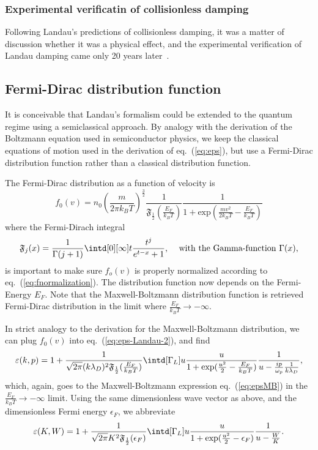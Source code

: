 \documentclass[physics,phd,nolot,nolof]{uccthesis}%
\begin{document}
\subsubsection{Experimental verificatin of collisionless damping}
Following Landau's predictions of collisionless damping, it was a matter of discussion whether it was a physical effect\cite{boydsanderson},
and the experimental verification of Landau damping came only 20 years later~\cite{PhysRevLett.13.184,PhysRevLett.17.175}.
\subsection{Fermi-Dirac distribution function}
It is conceivable that Landau's formalism could be extended to the quantum regime using a semiclassical approach. 
By analogy with the derivation of the Boltzmann equation used in semiconductor physics, we keep the classical equations of motion used in the derivation of eq.~(\ref{eq:eps}), but use a Fermi-Dirac distribution function rather than a classical distribution function. 

The Fermi-Dirac distribution as a function of velocity is
\begin{equation}
	f_0(v)=n_0 \left(\frac{m}{2\pi k_BT}\right)^{\frac{3}{2}}\frac{1}{\mathfrak{F}_\frac{1}{2}(\frac{E_F}{k_BT})}
	\frac{1}{1+\text{exp}(\frac{mv^2}{2k_BT}-\frac{E_F}{k_BT})}
	\label{eq:Fermi-Dirac-Distribution-function}
\end{equation}
where the Fermi-Dirach integral
\begin{equation}
	\mathfrak{F}_j(x)=\frac{1}{\Gamma(j+1)}\intd[0][\infty]t\frac{t^j}{e^{t-x}+1},\;\;\;\
	\text{with the Gamma-function }\Gamma(x), 
	\label{eq:fermidiracintegral}
\end{equation}
is important to make sure $f_o(v)$ is properly normalized according to eq.~(\ref{eq:fnormalization}).
The distribution function now depends on the Fermi-Energy $E_F$. 
Note that the Maxwell-Boltzmann distribution function is retrieved Fermi-Dirac distribution in the limit where $\frac{E_F}{k_BT}\to-\infty$.

In strict analogy to the derivation for the Maxwell-Boltzmann distribution, we can plug $f_0(v)$ into eq.~(\ref{eq:eps-Landau-2}), and find
\begin{equation}
	\varepsilon(k,p)=1+\frac{1}{\sqrt{2\pi}(k\lambda_D)^2 \mathfrak{F}_\frac{1}{2}(\frac{E_F}{k_BT})}
	\intd[\Gamma_L]u 
	\frac{u}{1+\text{exp}(\frac{u^2}{2}-\frac{E_F}{k_BT})}
	\frac{1}{u-\frac{ip}{\omega_p}\frac{1}{k \lambda_D}}
	,
	\label{eq:epsFD}
\end{equation}
which, again, goes to the Maxwell-Boltzmann expression eq.~(\ref{eq:epsMB}) in the 
$\frac{E_F}{k_BT}\to-\infty$ limit.
Using the same dimensionless wave vector as above, and the dimensionless Fermi energy $\epsilon_F$,
we abbreviate
\begin{equation}
	\varepsilon(K,W)=1+\frac{1}{\sqrt{2\pi}K^2 \mathfrak{F}_\frac{1}{2}(\epsilon_F)}
	\intd[\Gamma_L]u 
	\frac{u}{1+\text{exp}(\frac{u^2}{2}-\epsilon_F)}
	\frac{1}{u-\frac{W}{K}}
	.
	\label{eq:epsFDKW}
\end{equation}
\end{document}
